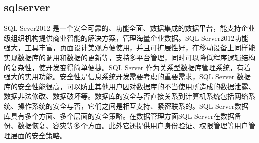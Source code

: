 \documentclass[a4paper]{ltxdoc}
\begin{document}
{		%
		
		
		
		
		
		\subsection{sqlserver}
		SQL Sever2012 是一个安全可靠的、功能全面、数据集成的数据平台，能支持企业级组织机构提供商业智能的解决方案，管理海量企业数据。SQL Server2012功能强大，工具丰富，页面设计美观方便使用，并且可扩展性好，在移动设备上同样能实现数据库的调用和数据的更新等，支持多平台管理，同时可以降低程序逻辑结构的复杂性，使开发变得简单便捷。SQL Server 作为关系型数据库管理系统，有着强大的实用功能。安全性是信息系统开发需要考虑的重要需求，SQL  Server 数据库的安全性能很高，可以防止其他用户因对数据库的不当使用所造成的数据泄露、数据非法修改、数据破坏等。数据库的安全与否直接关系到计算机系统包括网络系统、操作系统的安全与否，它们之间是相互支持、紧密联系的。SQL Server数据库具有多个方面、多个层面的安全策略。在数据管理方面SQL Server在数据备份、数据恢复、容灾等多个方面。此外它还提供用户身份验证、权限管理等用户管理层面的安全策略。 
		
}
\end{document}
